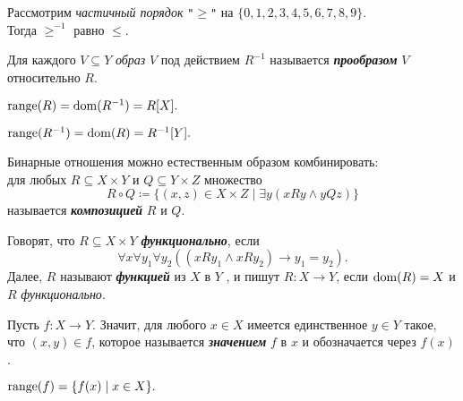 \documentclass{article}
\begin{document}
    \begin{example}
        Рассмотрим \textit{частичный порядок} \texttt{"$\geqslant$"} на $\{0,1,2,3,4,5,6,7,8,9\}.$\\
        Тогда $\geqslant^{-1}$ равно $\leqslant.$
    \end{example}

    \begin{definition_boxed}
        Для каждого $V \subseteq Y$ \textit{образ} $V$ под действием $R^{-1}$ называется \textbf{\textit{прообразом}} $V$ относительно $R$.
    \end{definition_boxed}

    \begin{example}
        $\mathrm{range}(R) = \mathrm{dom}(R^{-1}) = R [X].$
    \end{example}
    \begin{example}
        $\mathrm{range}(R^{-1}) =\mathrm{dom}(R) = R^{-1}[Y].$
    \end{example}

    \begin{definition_boxed}
        Бинарные отношения можно естественным образом комбинировать: \\
        для любых $R \subseteq X \times Y$ и $Q \subseteq Y \times Z$ множество
        \[R\circ Q \coloneqq \{(x,z) \in X\times Z\mid \exists y(xRy \wedge yQz)\}\]
        называется \textbf{\textit{композицией}} $R$ и $Q$.
    \end{definition_boxed}

    \begin{definition_boxed}
        Говорят, что $R \subseteq X \times Y$ \textbf{\textit{функционально}}, если
        \[\forall x \forall y_1 \forall y_2 ((xRy_1 \wedge xRy_2) \rightarrow y_1 = y_2).\]
        Далее, $R$ называют \textbf{\textit{функцией}} из $X$ в $Y$ , и пишут $R : X \rightarrow Y$, если $\mathrm{dom}(R) = X$ и $R$ \textit{функционально}.
    \end{definition_boxed}

    \begin{definition_boxed}
        Пусть $f : X \rightarrow Y$.
        Значит, для любого $x \in X$ имеется единственное $y \in Y$ такое, что $(x , y) \in f$, которое называется \textbf{\textit{значением}} $f$ в $ x $ и обозначается через $ f (x) $.
    \end{definition_boxed}

    \begin{example}
        $\mathrm{range}(f) = \{f(x)\mid x\in X\}.$
    \end{example}
\end{document}
